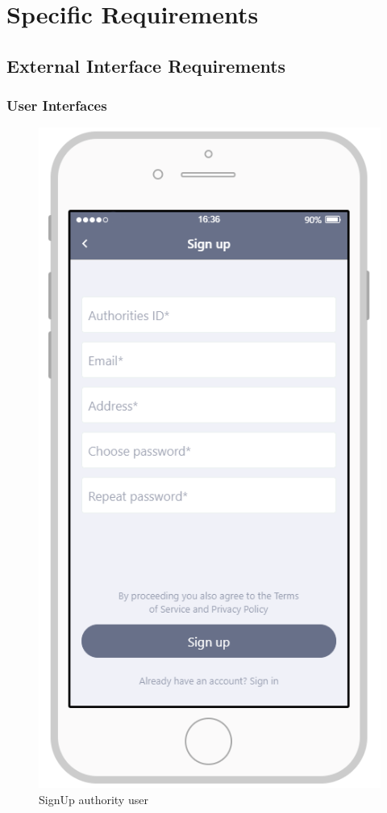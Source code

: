 \documentclass{article}
\begin{document}
\section{Specific Requirements}
\subsection{External Interface Requirements}
\subsubsection{User Interfaces}
\begin{figure}[H]
    \centering
    \includegraphics[scale=0.7]{Images/SignUpAuthoritiesApp}
    \caption{SignUp authority user}
\end{figure}
\end{document}
